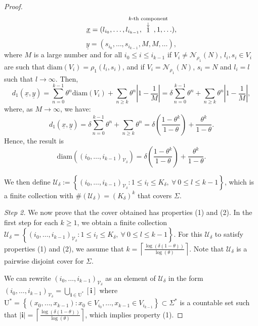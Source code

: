 \documentclass[11pt, reqno]{amsart}
\theoremstyle{plain}%
\theoremstyle{definition}
\theoremstyle{definition}
\def\U{\ensuremath{\mathcal U}}
\def\st{such that }
\def\ulx{\underline{x}}
\def\uly{\underline{y}}
\def\i{\textbf{i}}
\numberwithin{equation}{section}
\begin{document}
\begin{proof}
$$\ulx=(l_{i_0},\ldots,l_{i_{k-1}},\!\!\!\!\!\!\!\!\!\!\!\!\stackrel{\scriptstyle k\text{-th component}}{\stackrel{\small{\downarrow}}1}\!\!\!\!\!\!\!\!\!\!\!\!,1,\ldots),$$
$$\uly=(s_{i_0},\ldots,s_{i_{k-1}},M,M,\ldots),$$
where $M$ is a large number and for all $i_0\le i\le i_{k-1}$ if $V_i\neq\mathcal{N}_{\rho_1}(N)$, $l_i,s_i\in V_i$ are \st $\text{diam}(V_i)={\rho_1}(l_i,s_i)$, and if $V_i=\mathcal{N}_{\rho_1}(N)$, $s_i=N$ and $l_i=l$ \st $l\to\infty$. Then, $$ d_1(\ulx,\underline{y})=\sum_{n=0}^{k-1} \theta^n \text{diam}(V_i)+\sum_{n\ge k} \theta^n \left| 1 - \frac{1}{M} \right|= \delta\sum_{n=0}^{k-1} \theta^n  +\sum_{n\ge k} \theta^n \left| 1 - \frac{1}{M} \right|,$$
where, as $M\to\infty$, we have:
$$ d_1(\ulx,\underline{y})=\delta \sum_{n=0}^{k-1} \theta^n +\sum_{n\ge k} \theta^n = \delta\left(\frac{1-\theta^k}{1-\theta}\right)+\frac{\theta^k}{1-\theta}.$$
Hence, the result is 
\begin{equation} \label{Diam_Union_Full}
\text{diam}\left((i_0,\ldots,i_{k-1})_{\mathcal{V}_\delta}\right)=\delta\left(\frac{1-\theta^k}{1-\theta}\right)+\frac{\theta^k}{1-\theta}.
\end{equation} 

We then define $\U_{\delta}:=\left\{(i_0,\ldots,i_{k-1})_{\mathcal{V}_\delta}: 1\le i_l\le K_{\delta}, \ \forall \ 0\le l\le k-1 \right\}$, which is a finite collection with $\#(\U_{\delta})=(K_\delta)^k$ that covers $\Sigma$.

\textit{Step 2.} We now prove that the cover obtained has properties (1) and (2). In the first step for each $k\ge1$, we obtain a finite collection $\U_{\delta}=\left\{(i_0,\ldots,i_{k-1})_{\mathcal{V}_\delta}: 1\le i_l\le K_{\delta}, \ \forall \ 0\le l\le k-1 \right\}$. For this $\U_{\delta}$ to satisfy properties (1) and (2), we assume that $k=\left\lceil \frac{\log(\delta(1-\theta))}{\log(\theta)}\right\rceil$. Note that $\U_{\delta}$ is a pairwise disjoint cover for $\Sigma$.

We can rewrite $(i_0,\ldots,i_{k-1})_{\mathcal{V}_\delta}$ as an element of $\U_{\delta}$ in the form $(i_0,\ldots,i_{k-1})_{\mathcal{V}_\delta}=\bigcup_{\i\in \mathrm{U^*}}[\textbf{i}]$ where $\mathrm{U^*}=\left\{ (x_0,\ldots,x_{k-1}):  x_0\in V_{i_0},\ldots,x_{k-1}\in V_{i_{k-1}}    \right\}\subset \Sigma^*$ is a countable set such that $|\textbf{i}|= \left\lceil\frac{\log(\delta(1-\theta))}{\log(\theta)}\right\rceil$, which implies property (1). 
    



\end{proof}
\end{document}

